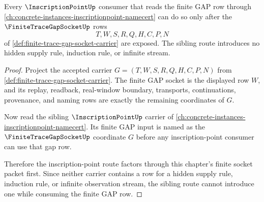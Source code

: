 \begin{theorem}
\label{thm:finite-trace-gap-socket-inscription-point-sibling-route}
Every $\InscriptionPointUp$ consumer that reads the finite GAP row through \autoref{ch:concrete-instances-inscriptionpoint-namecert} can do so only after the $\FiniteTraceGapSocketUp$ rows
$$
T,W,S,R,Q,H,C,P,N
$$
of \autoref{def:finite-trace-gap-socket-carrier} are exposed. The sibling route introduces no hidden supply rule, induction rule, or infinite stream.
\end{theorem}
\begin{proof}
Project the accepted carrier $G=(T,W,S,R,Q,H,C,P,N)$ from \autoref{def:finite-trace-gap-socket-carrier}. The finite GAP socket is the displayed row $W$, and its replay, readback, real-window boundary, transports, continuations, provenance, and naming rows are exactly the remaining coordinates of $G$.

Now read the sibling $\InscriptionPointUp$ carrier of \autoref{ch:concrete-instances-inscriptionpoint-namecert}. Its finite GAP input is named as the $\FiniteTraceGapSocketUp$ coordinate $G$ before any inscription-point consumer can use that gap row.

Therefore the inscription-point route factors through this chapter's finite socket packet first. Since neither carrier contains a row for a hidden supply rule, induction rule, or infinite observation stream, the sibling route cannot introduce one while consuming the finite GAP row.
\end{proof}

